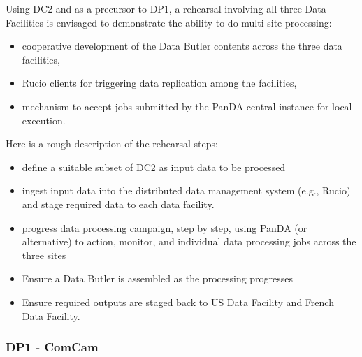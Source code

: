 Using DC2 and as a precursor to DP1, a rehearsal involving all three Data Facilities is envisaged to demonstrate the ability to do multi-site processing:

\begin{itemize}
  
\item cooperative development of the Data Butler contents across the three data facilities,
  
\item Rucio clients for triggering data replication among the facilities,
  
\item mechanism to accept jobs submitted by the PanDA central instance for local execution.
  
\end{itemize}

Here is a rough description of the rehearsal steps:

\begin{itemize}

\item define a suitable subset of DC2 as input data to be processed

\item ingest input data into the distributed data management system (e.g., Rucio) and stage required data to each data facility.

\item progress data processing campaign, step by step, using PanDA (or alternative) to action, monitor, and individual data processing jobs across the three sites

\item Ensure a Data Butler is assembled as the processing progresses

\item Ensure required outputs are staged back to US Data Facility and French Data Facility.

\end{itemize}

\subsubsection{ \gls{DP1} - ComCam}

